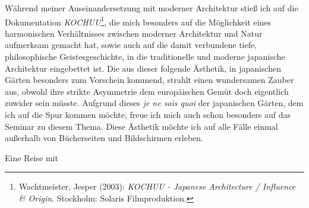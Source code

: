 \documentclass[a4paper]{article}
\begin{document}
Während meiner Auseinandersetzung mit moderner Architektur stieß ich auf die Dokumentation \emph{KOCHUU}\footnote{Wachtmeister, Jesper (2003): \emph{KOCHUU - Japanese Architecture / Influence \& Origin}. Stockholm: Solaris Filmproduktion.}, die mich besonders auf die Möglichkeit eines harmonischen Verhältnisses zwischen moderner Architektur und Natur aufmerksam gemacht hat, sowie auch auf die damit verbundene tiefe, philosophische Geistesgeschichte, in die traditionelle und moderne japanische Architektur eingebettet ist. Die aus dieser folgende Ästhetik, in japanischen Gärten besonders zum Vorschein kommend, strahlt einen wundersamen Zauber aus, obwohl ihre strikte Asymmetrie dem europäischen Gemüt doch eigentlich zuwider sein müsste. Aufgrund dieses \emph{je ne sais quoi} der japanischen Gärten, dem ich auf die Spur kommen möchte, freue ich mich auch schon besonders auf das Seminar zu diesem Thema. Diese Ästhetik möchte ich auf alle Fälle einmal außerhalb von Bücherseiten und Bildschirmen erleben.


 Eine Reise mit 


\newpage
\printbibliography
\end{document}
